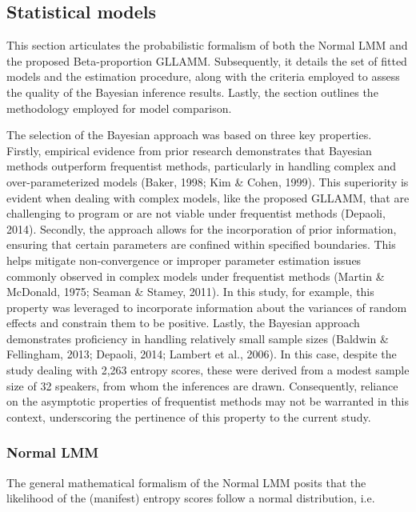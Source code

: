 \documentclass[
]{agujournal2019}
\begin{document}
\subsection{Statistical models}\label{sec-M-SM}

This section articulates the probabilistic formalism of both the Normal
LMM and the proposed Beta-proportion GLLAMM. Subsequently, it details
the set of fitted models and the estimation procedure, along with the
criteria employed to assess the quality of the Bayesian inference
results. Lastly, the section outlines the methodology employed for model
comparison.

The selection of the Bayesian approach was based on three key
properties. Firstly, empirical evidence from prior research demonstrates
that Bayesian methods outperform frequentist methods, particularly in
handling complex and over-parameterized models (Baker, 1998; Kim \&
Cohen, 1999). This superiority is evident when dealing with complex
models, like the proposed GLLAMM, that are challenging to program or are
not viable under frequentist methods (Depaoli, 2014). Secondly, the
approach allows for the incorporation of prior information, ensuring
that certain parameters are confined within specified boundaries. This
helps mitigate non-convergence or improper parameter estimation issues
commonly observed in complex models under frequentist methods (Martin \&
McDonald, 1975; Seaman \& Stamey, 2011). In this study, for example,
this property was leveraged to incorporate information about the
variances of random effects and constrain them to be positive. Lastly,
the Bayesian approach demonstrates proficiency in handling relatively
small sample sizes (Baldwin \& Fellingham, 2013; Depaoli, 2014; Lambert
et al., 2006). In this case, despite the study dealing with 2,263
entropy scores, these were derived from a modest sample size of 32
speakers, from whom the inferences are drawn. Consequently, reliance on
the asymptotic properties of frequentist methods may not be warranted in
this context, underscoring the pertinence of this property to the
current study.

\subsubsection{Normal LMM}\label{sec-M-SM-NLMM}

The general mathematical formalism of the Normal LMM posits that the
likelihood of the (manifest) entropy scores follow a normal
distribution, i.e.
\end{document}
